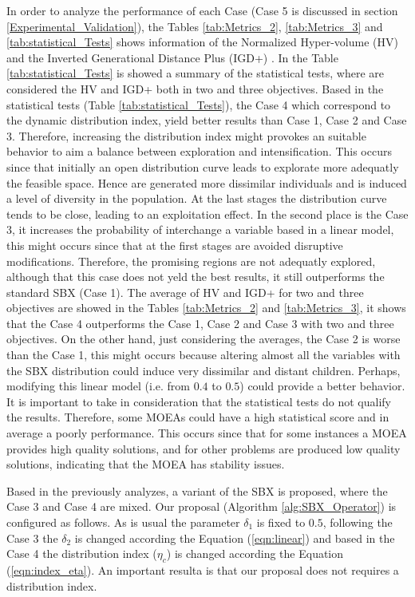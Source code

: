 In order to analyze the performance of each Case (Case 5 is discussed in section \ref{Experimental_Validation}), the Tables \ref{tab:Metrics_2}, \ref{tab:Metrics_3} and \ref{tab:statistical_Tests} shows information of the Normalized Hyper-volume (HV) \cite{zitzler1999multiobjective} and the Inverted Generational Distance Plus (IGD+) \cite{Joel:IGDPlus_And_GDPlus}.
%
In the Table \ref{tab:statistical_Tests} is showed a summary of the statistical tests, where are considered the HV and IGD+ both in two and three objectives.
%
Based in the statistical tests (Table \ref{tab:statistical_Tests}), the Case 4 which correspond to the dynamic distribution index, yield better results than Case 1, Case 2 and Case 3.
%
Therefore, increasing the distribution index might provokes an suitable behavior to aim a balance between exploration and intensification.
%
This occurs since that initially an open distribution curve leads to explorate more adequatly the feasible space.
%
Hence are generated more dissimilar individuals and is induced a level of diversity in the population.
%
At the last stages the distribution curve tends to be close, leading to an exploitation effect.
%
In the second place is the Case 3, it increases the probability of interchange a variable based in a linear model, this might occurs since that at the first stages are avoided disruptive modifications.
%
Therefore, the promising regions are not adequatly explored, although that this case does not yeld the best results, it still outperforms the standard SBX (Case 1).
%
%
The average of HV and IGD+ for two and three objectives are showed in the Tables \ref{tab:Metrics_2} and \ref{tab:Metrics_3}, it shows that the Case 4 outperforms the Case 1, Case 2 and Case 3 with two and three objectives.
%
On the other hand, just considering the averages, the Case 2 is worse than the Case 1, this might occurs because altering almost all the variables with the SBX distribution could induce very dissimilar and distant children.
%
Perhaps, modifying this linear model (i.e. from $0.4$ to $0.5$) could provide a better behavior.
%
It is important to take in consideration that the statistical tests do not qualify the results.
%
Therefore, some MOEAs could have a high statistical score and in average a poorly performance.
%
This occurs since that for some instances a MOEA provides high quality solutions, and for other problems are produced low quality solutions, indicating that the MOEA has stability issues.

%
Based in the previously analyzes, a variant of the SBX is proposed, where the Case 3 and Case 4 are mixed.
%
Our proposal (Algorithm \ref{alg:SBX_Operator}) is configured as follows.
%
As is usual the parameter $\delta_1$ is fixed to $0.5$, following the Case 3 the $\delta_2$ is changed according the Equation (\ref{eqn:linear}) and based in the Case 4 the distribution index ($\eta_c$) is changed according the Equation (\ref{eqn:index_eta}).
%
An important resulta is that our proposal does not requires a distribution index.
